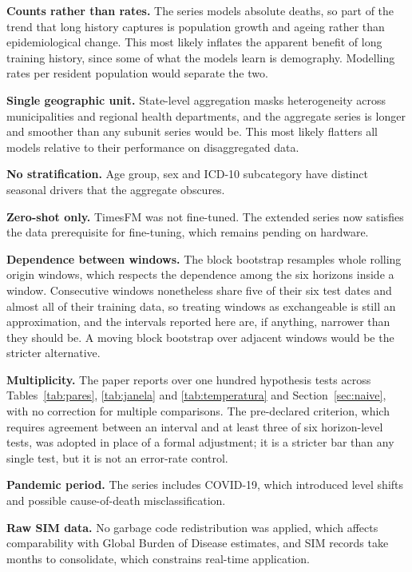 \textbf{Counts rather than rates.} The series models absolute deaths, so part of the trend
that long history captures is population growth and ageing rather than epidemiological
change. This most likely inflates the apparent benefit of long training history, since some
of what the models learn is demography. Modelling rates per resident population would
separate the two.

\textbf{Single geographic unit.} State-level aggregation masks heterogeneity across
municipalities and regional health departments, and the aggregate series is longer and
smoother than any subunit series would be. This most likely flatters all models relative to
their performance on disaggregated data.

\textbf{No stratification.} Age group, sex and ICD-10 subcategory have distinct seasonal
drivers that the aggregate obscures.

\textbf{Zero-shot only.} TimesFM was not fine-tuned. The extended series now satisfies the
data prerequisite for fine-tuning, which remains pending on hardware.

\textbf{Dependence between windows.} The block bootstrap resamples whole rolling origin
windows, which respects the dependence among the six horizons inside a window. Consecutive
windows nonetheless share five of their six test dates and almost all of their training
data, so treating windows as exchangeable is still an approximation, and the intervals
reported here are, if anything, narrower than they should be. A moving block bootstrap
over adjacent windows would be the stricter alternative.

\textbf{Multiplicity.} The paper reports over one hundred hypothesis tests across
Tables~\ref{tab:pares}, \ref{tab:janela} and \ref{tab:temperatura} and
Section~\ref{sec:naive}, with no correction for multiple comparisons. The pre-declared
criterion, which requires agreement between an interval and at least three of six
horizon-level tests, was adopted in place of a formal adjustment; it is a stricter bar than
any single test, but it is not an error-rate control.

\textbf{Pandemic period.} The series includes COVID-19, which introduced level shifts and
possible cause-of-death misclassification.

\textbf{Raw SIM data.} No garbage code redistribution was applied, which affects
comparability with Global Burden of Disease estimates, and SIM records take months to
consolidate, which constrains real-time application.

